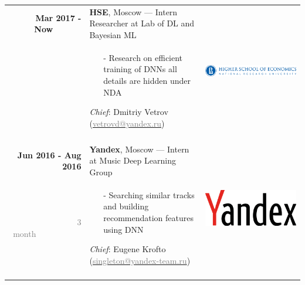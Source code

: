 \documentclass[a4paper,10pt]{article} %
\begin{document}
\begin{tabular}{r|p{11.5cm}c}
\textbf{Mar 2017 - Now~~~~~~} & 
\textbf{HSE}, Moscow --- Intern Researcher  at Lab of DL and Bayesian ML &
\multirow{2}{*}{	\vspace*{+5cm}\includegraphics[scale=0.032]{img/hse}} \\
~~~~~~~~~~~&  
\footnotesize{  \vspace{-0.25cm}
	\begin{itemize}
		\item[-] Research on efficient training of DNNs all details are hidden under NDA
	\end{itemize}
\scriptsize{
	\emph{Chief}: 
	Dmitriy Vetrov
	(\href{mailto:vetrovd@yandex.ru}{\textcolor{gray}{vetrovd@yandex.ru}})}
	\vspace{-0.1cm}} & 
\\
\multicolumn{2}{c}{}\\


\textbf{Jun 2016 - Aug 2016} & 
\textbf{Yandex}, Moscow --- Intern at Music Deep Learning Group &
\multirow{2}{*}{\includegraphics[scale=0.015]{img/yandex}} \\ 
\textcolor{gray}{3 month}~~~~~~~~~~~&  \footnotesize{
  
  \vspace{-0.25cm}
  \begin{itemize}
      \item[-] Searching similar tracks and building recommendation features using DNN
  \end{itemize}
\scriptsize{
	\emph{Chief}:  
	Eugene Krofto
	(\href{mailto:singleton@yandex-team.ru}{\textcolor{gray}{singleton@yandex-team.ru}})}
  \vspace{-0.1cm}
} & 
\\
\multicolumn{2}{c}{}\\


\end{tabular}
\end{document}

